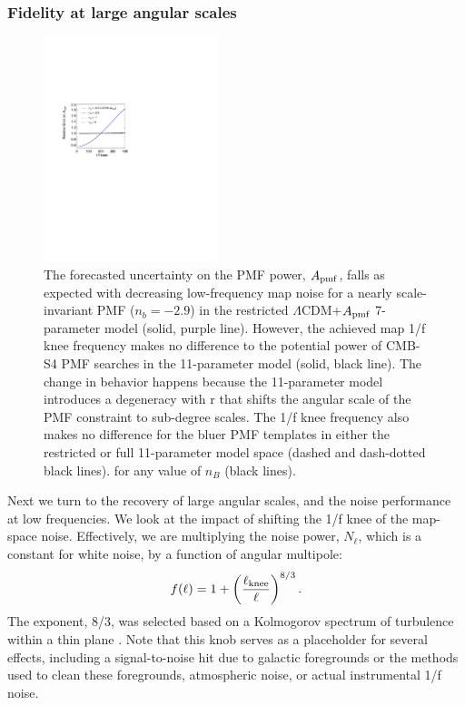 \documentclass[apj]{emulateapj}
\newcommand{\apmf}{\ensuremath{A_{\rm pmf}}}
\newcommand{\lcdm}{\ensuremath{\Lambda}CDM}
\newcommand{\be}{\begin{equation}}
\newcommand{\ee}{\end{equation}}
\begin{document}
\subsubsection{Fidelity at large angular scales}

\begin{figure}[htb]\centering
\includegraphics[width=0.45\textwidth,clip,trim={1.5cm 12.5cm 11cm 7.5cm}]{pmf_knee.pdf}
  \caption[Map knee dependence]{
  The forecasted uncertainty on the PMF power, \apmf{}, falls as expected with decreasing low-frequency map noise for a nearly scale-invariant PMF ($n_b = -2.9$) in the restricted \lcdm{}+\apmf{} 7-parameter model (solid, purple line). 
  However,  the achieved map 1/f knee frequency makes no difference to the potential power of CMB-S4 PMF searches in the 11-parameter model (solid, black line). 
  The change in behavior happens because the 11-parameter model introduces a degeneracy with r that shifts the angular scale of the PMF constraint to sub-degree scales. 
  The 1/f knee frequency also makes no difference for the bluer PMF templates in either the restricted or full 11-parameter model space (dashed and dash-dotted black lines). 
   for any value of $n_B$ (black lines). 
    \label{fig:knee}
  }
\end{figure}

Next we turn to the recovery of large angular scales, and the noise performance at low frequencies. 
We look at the impact of shifting the 1/f knee of the map-space noise. 
Effectively, we are multiplying the noise power, $N_\ell$, which is a constant for white noise,  by a function of angular multipole:
\be \label{eqn:knee}
f(\ell) = 1 + \left(\frac{\ell_{\rm knee}}{\ell}\right)^{8/3}.
\ee 
The exponent, 8/3, was selected based on a Kolmogorov spectrum of turbulence within a thin plane \citep{lay00}. %
Note that this knob  serves as a placeholder for several effects, including a signal-to-noise hit due to galactic foregrounds or the methods used to clean these foregrounds, atmospheric noise, or actual instrumental 1/f noise. 
\end{document}
